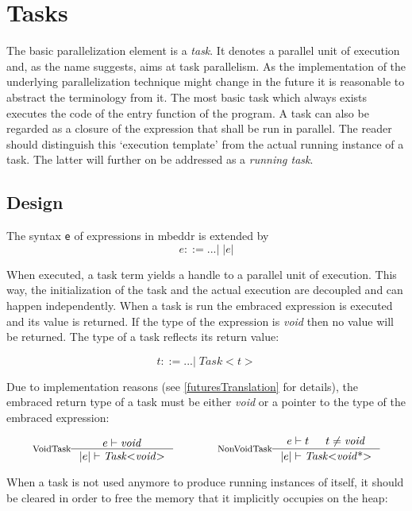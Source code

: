 \section{Tasks}
The basic parallelization element is a \textit{task}. It denotes a parallel unit of execution and, as the name suggests, aims at task parallelism. As the implementation of the underlying parallelization technique might change in the future it is reasonable to abstract the terminology from it. The most basic task which always exists executes the code of the entry function of the program. A task can also be regarded as a closure of the expression that shall be run in parallel. The reader should distinguish this `execution template' from the actual running instance of a task. The latter will further on be addressed as a \textit{running task}.
\subsection{Design}
\label{tasksDesign}
The syntax \texttt{e} of expressions in mbeddr is extended by
\begin{equation}
e ::= ...|\;\mathit{|e|}
\end{equation}

When executed, a task term yields a handle to a parallel unit of execution. This way, the initialization of the task and the actual execution are decoupled and can happen independently. When a task is run the embraced expression is executed and its value is returned. If the type of the expression is \textit{void} then no value will be returned. The type of a task reflects its return value:

\begin{equation}
t ::= ... |\;\mathit{Task{<}t{>}}
\end{equation}

Due to implementation reasons (see \ref{futuresTranslation} for details), the embraced return type of a task must be either \textit{void} or a pointer to the type of the embraced expression:

\begin{equation}
\inference*[VoidTask]{e |- \mathit{void}}{|e| |- \mathit{Task{<}void{>}}} 
\qquad\qquad
\inference*[NonVoidTask]{e |- t & t \neq \mathit{void}}{|e| |- \mathit{Task{<}void{\text{*}}{>}}}
\end{equation}

When a task is not used anymore to produce running instances of itself, it should be cleared in order to free the memory that it implicitly occupies on the heap:

